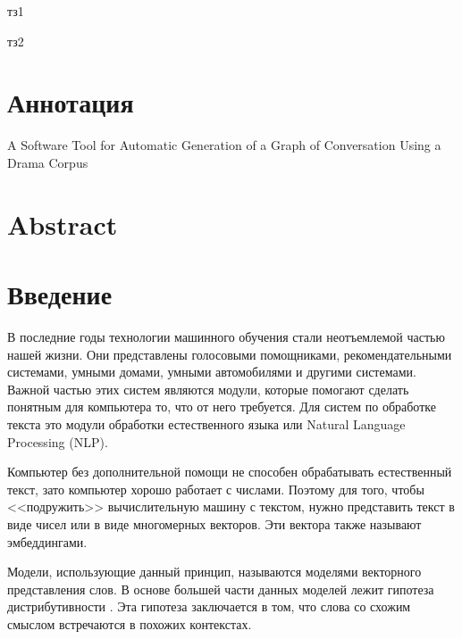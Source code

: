 \documentclass[a4paper,14pt]{article}
\begin{document}
 	
	

\pagebreak

тз1

\pagebreak

тз2	

\pagebreak
	
\section*{\normalsize \hfill Аннотация \hfill}

\sloppy

\begin{center}
	A Software Tool for Automatic Generation of a Graph of Conversation Using a Drama Corpus
\end{center}
\section*{\normalsize \hfill Abstract \hfill}


\newpage

\tableofcontents
\pagebreak

\section*{Введение}


В последние годы технологии машинного обучения стали неотъемлемой частью нашей жизни. 
Они представлены голосовыми помощниками, рекомендательными системами, умными домами, умными автомобилями и другими системами.
Важной частью этих систем являются модули, которые помогают сделать понятным для компьютера то, что от него требуется.
Для систем по обработке текста это модули обработки естественного языка или Natural Language Processing (NLP).

Компьютер без дополнительной помощи не способен обрабатывать естественный текст, зато компьютер хорошо работает с числами.
Поэтому для того, чтобы <<подружить>> вычислительную машину с текстом, нужно представить текст в виде чисел или в виде многомерных векторов.
Эти вектора также называют эмбеддингами.

Модели, использующие данный принцип, называются моделями векторного представления слов.
В основе большей части данных моделей лежит гипотеза дистрибутивности \cite{distrib}.
Эта гипотеза заключается в том, что слова со схожим смыслом встречаются в похожих контекстах.
\end{document}
